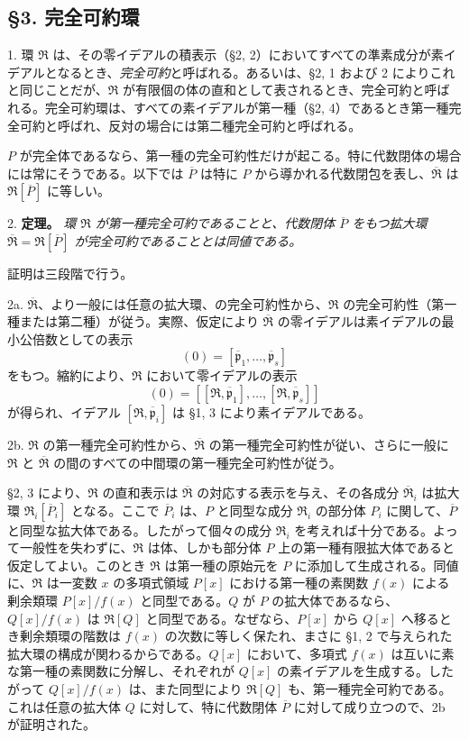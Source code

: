 \documentclass[11pt]{article}
\providecommand{\mR}{\mathfrak{R}}
\providecommand{\bR}{\overline{\mathfrak{R}}}
\providecommand{\bP}{\overline{P}}
\providecommand{\bp}{\overline{\mathfrak{p}}}
\begin{document}
\subsection*{\S 3. 完全可約環}

1. 環 $\mR$ は、その零イデアルの積表示（\S 2, 2）においてすべての準素成分が素イデアルとなるとき、\emph{完全可約}と呼ばれる。あるいは、\S 2, 1 および 2 によりこれと同じことだが、$\mR$ が有限個の体の直和として表されるとき、完全可約と呼ばれる。完全可約環は、すべての素イデアルが第一種（\S 2, 4）であるとき第一種完全可約と呼ばれ、反対の場合には第二種完全可約と呼ばれる。

$P$ が完全体であるなら、第一種の完全可約性だけが起こる。特に代数閉体の場合には常にそうである。以下では $\bP$ は特に $P$ から導かれる代数閉包を表し、$\bR$ は $\mR[\bP]$ に等しい。

2. \textbf{定理。} \emph{環 $\mR$ が第一種完全可約であることと、代数閉体 $\bP$ をもつ拡大環 $\bR=\mR[\bP]$ が完全可約であることとは同値である。}

証明は三段階で行う。

2a. $\bR$、より一般には任意の拡大環、の完全可約性から、$\mR$ の完全可約性（第一種または第二種）が従う。実際、仮定により $\bR$ の零イデアルは素イデアルの最小公倍数としての表示
\[
        (0)=[\bp_1,\ldots,\bp_s]
\]
をもつ。縮約により、$\mR$ において零イデアルの表示
\[
        (0)=[[\mR,\bp_1],\ldots,[\mR,\bp_s]]
\]
が得られ、イデアル $[\mR,\bp_i]$ は \S 1, 3 により素イデアルである。

2b. $\mR$ の第一種完全可約性から、$\bR$ の第一種完全可約性が従い、さらに一般に $\mR$ と $\bR$ の間のすべての中間環の第一種完全可約性が従う。

\S 2, 3 により、$\mR$ の直和表示は $\bR$ の対応する表示を与え、その各成分 $\bR_i$ は拡大環 $\mR_i[\bP_i]$ となる。ここで $\bP_i$ は、$P$ と同型な成分 $\mR_i$ の部分体 $P_i$ に関して、$\bP$ と同型な拡大体である。したがって個々の成分 $\mR_i$ を考えれば十分である。よって一般性を失わずに、$\mR$ は体、しかも部分体 $P$ 上の第一種有限拡大体であると仮定してよい。このとき $\mR$ は第一種の原始元を $P$ に添加して生成される。同値に、$\mR$ は一変数 $x$ の多項式領域 $P[x]$ における第一種の素関数 $f(x)$ による剰余類環 $P[x]/f(x)$ と同型である。$Q$ が $P$ の拡大体であるなら、$Q[x]/f(x)$ は $\mR[Q]$ と同型である。なぜなら、$P[x]$ から $Q[x]$ へ移るとき剰余類環の階数は $f(x)$ の次数に等しく保たれ、まさに \S 1, 2 で与えられた拡大環の構成が関わるからである。$Q[x]$ において、多項式 $f(x)$ は互いに素な第一種の素関数に分解し、それぞれが $Q[x]$ の素イデアルを生成する。したがって $Q[x]/f(x)$ は、また同型により $\mR[Q]$ も、第一種完全可約である。これは任意の拡大体 $Q$ に対して、特に代数閉体 $\bP$ に対して成り立つので、2b が証明された。
\end{document}
